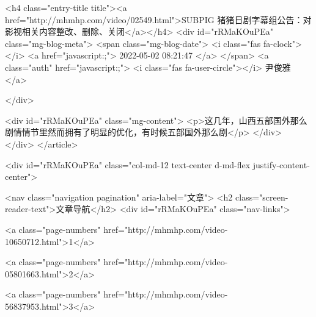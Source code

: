                                             <h4 class="entry-title title"><a href="http://mhmhp.com/video/02549.html">SUBPIG 猪猪日剧字幕组公告：对影视相关内容整改、删除、关闭</a></h4>
                                            <div id="rRMaKOuPEa"  class="mg-blog-meta">
                                                <span class="mg-blog-date">
                                                    <i class="fas fa-clock"></i>
                                                    <a href="javascript:;">
                                                        2022-05-02 08:21:47
                                                    </a>
                                                </span>
                                                <a class="auth" href="javascript:;">
                                                    <i class="fas fa-user-circle"></i>
                                                    尹俊雅
                                                </a>

                                            </div>


                                            <div id="rRMaKOuPEa"  class="mg-content">
                                                <p>这几年，山西五部国外那么剧情情节里然而拥有了明显的优化，有时候五部国外那么剧</p>
                                            </div>
                                        </div>
                                    </article>
                                    
                                    <div id="rRMaKOuPEa"  class="col-md-12 text-center d-md-flex justify-content-center">

                                        <nav class="navigation pagination" aria-label="文章">
                                            <h2 class="screen-reader-text">文章导航</h2>
                                            <div id="rRMaKOuPEa"  class="nav-links">
                                                
                                                <a class="page-numbers" href="http://mhmhp.com/video-10650712.html">1</a>
                                                
                                                <a class="page-numbers" href="http://mhmhp.com/video-05801663.html">2</a>
                                                
                                                <a class="page-numbers" href="http://mhmhp.com/video-56837953.html">3</a>
                                                
